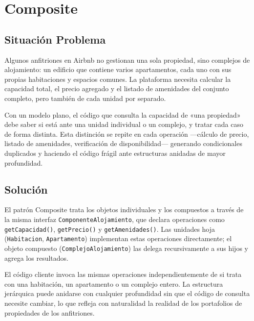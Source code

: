 
\chapter{Composite}

\section{Situación Problema}

Algunos anfitriones en Airbnb no gestionan una sola propiedad, sino
complejos de alojamiento: un edificio que contiene varios apartamentos,
cada uno con sus propias habitaciones y espacios comunes. La plataforma
necesita calcular la capacidad total, el precio agregado y el listado
de amenidades del conjunto completo, pero también de cada unidad por
separado.

Con un modelo plano, el código que consulta la capacidad de «una
propiedad» debe saber si está ante una unidad individual o un complejo,
y tratar cada caso de forma distinta. Esta distinción se repite en cada
operación —cálculo de precio, listado de amenidades, verificación de
disponibilidad— generando condicionales duplicados y haciendo el código
frágil ante estructuras anidadas de mayor profundidad.

\section{Solución}

El patrón Composite trata los objetos individuales y los compuestos a
través de la misma interfaz \texttt{ComponenteAlojamiento}, que declara
operaciones como \texttt{getCapacidad()}, \texttt{getPrecio()} y
\texttt{getAmenidades()}. Las unidades hoja (\texttt{Habitacion},
\texttt{Apartamento}) implementan estas operaciones directamente; el
objeto compuesto (\texttt{ComplejoAlojamiento}) las delega
recursivamente a sus hijos y agrega los resultados.

El código cliente invoca las mismas operaciones independientemente de
si trata con una habitación, un apartamento o un complejo entero. La
estructura jerárquica puede anidarse con cualquier profundidad sin que
el código de consulta necesite cambiar, lo que refleja con naturalidad
la realidad de los portafolios de propiedades de los anfitriones.

